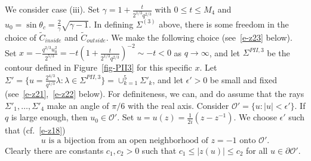 \documentclass{amsart}
\theoremstyle{definition}
\theoremstyle{remark}
\numberwithin{equation}{section}
\newcommand{\wt}{\widetilde}
\begin{document}
\bigskip
\begin{figure}[ht]
 \centerline{}
 \caption{}\label{fig-umap2}
\end{figure}
We consider case (iii).
Set $\gamma =1+\frac{t}{2^{1/3}q^{2/3}}$ with $0\le t \le M_4$ and $u_0=\sin{\theta_c}=\frac2{\gamma} \sqrt{\gamma-1}$.
In defining $\Sigma^{(3)}$ above, there is some freedom in the choice 
of $\wt{C}_{inside}$ and $\wt{C}_{outside}$.
We make the following choice (see~\eqref{e-z23} below). 
Set $x=-\frac{q^{2/3}u_0^2}{2^{5/3}}=
-t(1+\frac{t}{2^{1/3}q^{2/3}})^{-2} \sim -t<0$ as $q\to\infty$,  
and let $\Sigma^{PII,3}$ be the contour defined in Figure~\ref{fig-PII3} 
for this specific $x$.
Let $\Sigma'=\{ u=\frac{2^{4/3}}{q^{1/3}}\lambda : \lambda\in\Sigma^{PII,3} \}
=\cup_{k=1}^5 \Sigma'_k$, 
and let $\epsilon' >0$ be small and fixed (see~\eqref{e-z21},~\eqref{e-z22} below).
For definiteness, we can, and do assume that the rays 
$\Sigma'_1,\dots,\Sigma'_4$ make an angle of $\pi/6$ with the real axis.
Consider $\mathcal{O}'=\{ u : |u|<\epsilon' \}$.
If $q$ is large enough, then $u_0\in\mathcal{O}'$.
Set $u=u(z)=\frac1{2i}(z-z^{-1})$. 
We choose $\epsilon'$ such that (cf.~\eqref{e-z18}) 
\begin{equation}\label{e-z21}
   \text{$u$ is a bijection from an open neighborhood of $z=-1$ onto $\mathcal{O}'$.}
\end{equation}
Clearly there are constants $c_1,c_2>0$ such that 
$c_1\le |z(u)|\le c_2$ for all $u\in\partial\mathcal{O}'$.
\end{document}

